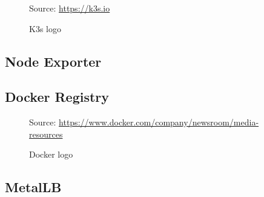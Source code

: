 \begin{figure} %
  \centering
  \def\stackalignment{r} %
  {\scriptsize \parbox[t]{\linewidth}{ Source: \url{https://k3s.io}} }
  \caption{K3s logo}
\end{figure}

\subsection{Node Exporter}
\label{subsec:implementation_dependencies_node_exporter}

\subsection{Docker Registry}
\label{subsec:implementation_dependencies_docker_registry}

\begin{figure} %
  \centering
  \def\stackalignment{r} %
  {\scriptsize \parbox[t]{\linewidth}{ Source: \url{https://www.docker.com/company/newsroom/media-resources}} }
  \caption{Docker logo}
\end{figure}

\subsection{MetalLB}
\label{subsec:implementation_dependencies_metallb}


